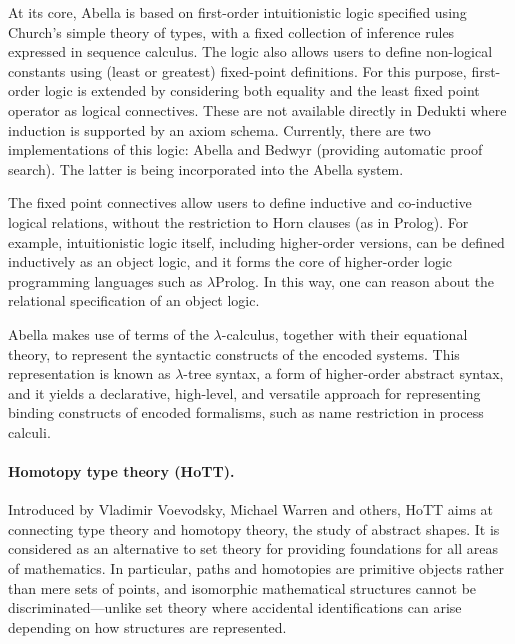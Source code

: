 At its core, Abella is based on first-order intuitionistic logic specified using
Church's simple theory of types, with a fixed collection of inference rules
expressed in sequence calculus. The logic also allows users to define
non-logical constants using (least or greatest) fixed-point definitions. For
this purpose, first-order logic is extended by considering both equality and the
least fixed point operator as logical connectives. These are not available
directly in Dedukti where induction is supported by an axiom schema. Currently,
there are two implementations of this logic: Abella and Bedwyr (providing
automatic proof search). The latter is being incorporated into the Abella
system.

The fixed point connectives allow users to define inductive and co-inductive
logical relations, without the restriction to Horn clauses (as in Prolog). For
example, intuitionistic logic itself, including higher-order versions, can be
defined inductively as an object logic, and it forms the core of higher-order
logic programming languages such as $\lambda$Prolog. In this way, one can reason
about the relational specification of an object logic.

Abella makes use of terms of the $\lambda$-calculus, together with their
equational theory, to represent the syntactic constructs of the encoded systems.
This representation is known as $\lambda$-tree syntax, a form of higher-order
abstract syntax, and it yields a declarative, high-level, and versatile approach
for representing binding constructs of encoded formalisms, such as name
restriction in process calculi.


\paragraph*{Homotopy type theory (HoTT).}

Introduced by Vladimir Voevodsky, Michael Warren and others, HoTT aims at
connecting type theory and homotopy theory, the study of abstract shapes. It is
considered as an alternative to set theory for providing foundations for all
areas of mathematics. In particular, paths and homotopies are primitive objects
rather than mere sets of points, and isomorphic mathematical structures cannot
be discriminated---unlike set theory where accidental identifications can arise
depending on how structures are represented.


